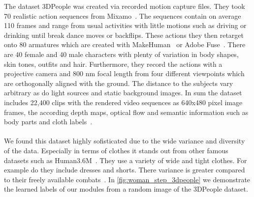 The dataset 3DPeople was created via recorded motion capture files.
They took 70 realistic action sequences from Mixamo~\cite{mixamomotionpac}.
The sequences contain on average 110 frames and range from usual activities with little motions such as driving
or drinking until break dance moves or backflips.
These actions they then retarget onto 80 armatures which are created with MakeHuman~\cite{makehuman} or Adobe
Fuse~\cite{adobefuse}.
There are 40 female and 40 male characters with plenty of variation in body shapes, skin tones, outfits and hair.
Furthermore, they record the actions with a projective camera and 800 nm focal length from four different viewpoints
which are orthogonally aligned with the ground.
The distance to the subjects vary arbitrary as do light sources and static background images.
In sum the dataset includes 22,400 clips with the rendered video sequences as 640x480 pixel image frames, the according
depth maps, optical flow and semantic information such as body parts and cloth labels~\cite{3dpeople}.
\\\mbox{}\\
We found this dataset highly sofisticated due to the wide variance and diversity of the data.
Especially in terms of clothes it stands out from other famous datasets such as Human3.6M~\cite{humaneva}.
They use a variety of wide and tight clothes. For example do they include dresses and shorts.
There variance is greater compared to their freely available combats~\cite{human36m, humaneva}.
In \autoref{fig:woman_step_3dpeople} we demonstrate the learned labels of our modules from a random image of the
3DPeople dataset.






